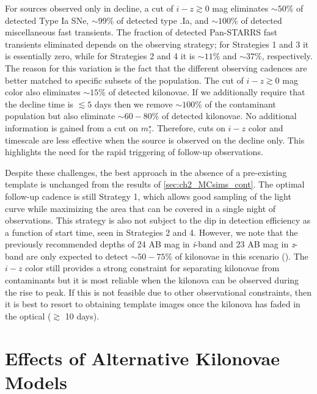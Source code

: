 \clearpage
For sources observed only in decline, a cut of $i-z\gtrsim0$ mag eliminates $\sim50\%$ of detected Type Ia SNe, $\sim99\%$ of detected type .Ia, and $\sim 100\%$ of detected miscellaneous fast transients. The fraction of detected Pan-STARRS fast transients eliminated depends on the observing strategy; for Strategies 1 and 3 it is essentially zero, while for Strategies 2 and 4 it is $\sim11\%$ and $\sim37\%$, respectively. The reason for this variation is the fact that the different observing cadences are better matched to specific subsets of the population. The cut of $i-z\gtrsim0$ mag color also eliminates $\sim 15\%$ of detected kilonovae. If we additionally require that the decline time is $\lesssim 5$ days then we remove $\sim100\%$ of the contaminant population but also eliminate $\sim60-80\%$ of detected kilonovae. No additional information is gained from a cut on $m^{\star}_z$. Therefore, cuts on $i-z$ color and timescale are less effective when the source is observed on the decline only. This highlights the need for the rapid triggering of follow-up observations.

Despite these challenges, the best approach in the absence of a pre-existing template is unchanged from the results of \cref{sec:ch2_MCsims_cont}. The optimal follow-up cadence is still Strategy 1, which allows good sampling of the light curve while maximizing the area that can be covered in a single night of observations. This strategy is also not subject to the dip in detection efficiency as a function of start time, seen in Strategies 2 and 4. However, we note that the previously recommended depths of 24 AB mag in {\em i}-band and 23 AB mag in {\em z}-band are only expected to detect $\sim50-75\%$ of kilonovae in this scenario (). The $i-z$ color still provides a strong constraint for separating kilonovae from contaminants but it is most reliable when the kilonova can be observed during the rise to peak. If this is not feasible due to other observational constraints, then it is best to resort to obtaining template images once the kilonova has faded in the optical ($\gtrsim$ 10 days).

\section{Effects of Alternative Kilonovae Models}
\label{sec:ch2_altkilo}

